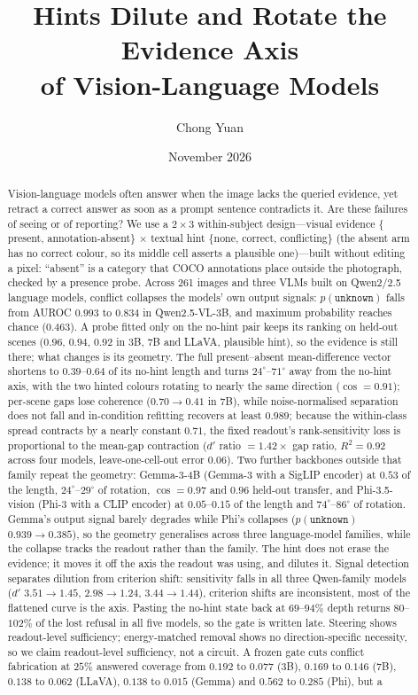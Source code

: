 \documentclass[10pt]{article}
\title{\bfseries Hints Dilute and Rotate the Evidence Axis\\[2pt]
of Vision-Language Models}
\author{Chong Yuan}
\date{November 2026}
\newcommand{\unknown}{\texttt{unknown}}
\newcommand{\punk}{p(\unknown)}
\begin{document}
\maketitle

\begin{abstract}
Vision-language models often answer when the image lacks the queried evidence, yet retract a correct answer as soon as a prompt sentence contradicts it. Are these failures of seeing or of reporting? We use a $2\times3$ within-subject design---visual evidence $\{$present, annotation-absent$\}$ $\times$ textual hint $\{$none, correct, conflicting$\}$ (the absent arm has no correct colour, so its middle cell asserts a plausible one)---built without editing a pixel: ``absent'' is a category that COCO annotations place outside the photograph, checked by a presence probe. Across 261 images and three VLMs built on Qwen2/2.5 language models, conflict collapses the models' own output signals: $\punk$ falls from AUROC $0.993$ to $0.834$ in Qwen2.5-VL-3B, and maximum probability reaches chance ($0.463$). A probe fitted only on the no-hint pair keeps its ranking on held-out scenes ($0.96$, $0.94$, $0.92$ in 3B, 7B and LLaVA, plausible hint), so the evidence is still there; what changes is its geometry. The full present--absent mean-difference vector shortens to $0.39$--$0.64$ of its no-hint length and turns $24^\circ$--$71^\circ$ away from the no-hint axis, with the two hinted colours rotating to nearly the same direction ($\cos=0.91$); per-scene gaps lose coherence ($0.70\to0.41$ in 7B), while noise-normalised separation does not fall and in-condition refitting recovers at least $0.989$; because the within-class spread contracts by a nearly constant $0.71$, the fixed readout's rank-sensitivity loss is proportional to the mean-gap contraction ($d'$ ratio $=1.42\times$ gap ratio, $R^2=0.92$ across four models, leave-one-cell-out error $0.06$). Two further backbones outside that family repeat the geometry: Gemma-3-4B (Gemma-3 with a SigLIP encoder) at $0.53$ of the length, $24^\circ$--$29^\circ$ of rotation, $\cos=0.97$ and $0.96$ held-out transfer, and Phi-3.5-vision (Phi-3 with a CLIP encoder) at $0.05$--$0.15$ of the length and $74^\circ$--$86^\circ$ of rotation. Gemma's output signal barely degrades while Phi's collapses ($\punk$ $0.939\to0.385$), so the geometry generalises across three language-model families, while the collapse tracks the readout rather than the family. The hint does not erase the evidence; it moves it off the axis the readout was using, and dilutes it. Signal detection separates dilution from criterion shift: sensitivity falls in all three Qwen-family models ($d'$ $3.51\to1.45$, $2.98\to1.24$, $3.44\to1.44$), criterion shifts are inconsistent, most of the flattened curve is the axis. Pasting the no-hint state back at $69$--$94\%$ depth returns $80$--$102\%$ of the lost refusal in all five models, so the gate is written late. Steering shows readout-level sufficiency; energy-matched removal shows no direction-specific necessity, so we claim readout-level sufficiency, not a circuit. A frozen gate cuts conflict fabrication at $25\%$ answered coverage from $0.192$ to $0.077$ (3B), $0.169$ to $0.146$ (7B), $0.138$ to $0.062$ (LLaVA), $0.138$ to $0.015$ (Gemma) and $0.562$ to $0.285$ (Phi), but a 
\end{abstract}
\end{document}
